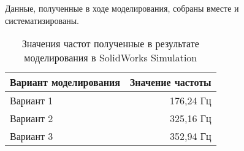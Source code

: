 Данные, полученные в ходе моделирования, собраны вместе и
систематизированы.

\begin{table}[H]
  \centering
  \begin{tabular}{|l | r |}
    \hline
    Вариант моделирования & Значение частоты \\ \hline
    Вариант 1 & 176,24 Гц\\ \hline
    Вариант 2 & 325,16 Гц\\ \hline
    Вариант 3 & 352,94 Гц \\ \hline
  \end{tabular}
  \caption{Значения частот полученные в результате моделирования в SolidWorks Simulation}
\end{table}

\newpage

